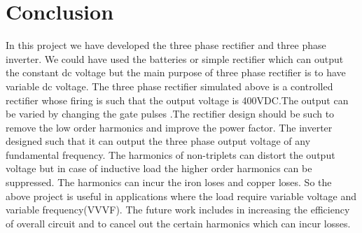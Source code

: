
\chapter{Conclusion} %
\label{Chapter5}
In this project we have developed the three phase rectifier and three phase inverter. We could have used the batteries or simple rectifier which can output the constant dc voltage but the main purpose of three phase rectifier is to have variable dc voltage.  The three phase rectifier simulated above is a controlled rectifier whose firing is such that the output voltage is 400VDC.The output can be varied by changing the gate pulses .The rectifier design should be such to remove the low order harmonics and improve the power factor. The inverter designed such that it can output the three phase output voltage of any fundamental frequency. The harmonics of non-triplets can distort the output voltage but in case of inductive load the higher order harmonics can be suppressed. The harmonics can incur the iron loses and copper loses. So the above project is useful in applications where the load require variable voltage and variable frequency(VVVF). The future work includes in increasing the efficiency of overall circuit and to cancel out the certain harmonics which can incur losses.